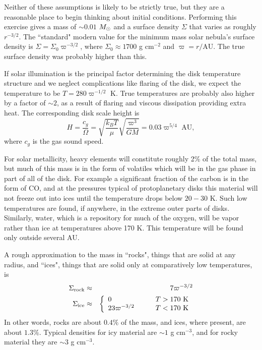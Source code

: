 Neither of these assumptions is likely to be strictly true, but they are a reasonable place to begin thinking about initial conditions. Performing this exercise gives a mass of $\sim 0.01$ $M_{\odot}$ and a surface density $\Sigma$ that varies as roughly $r^{-3/2}$. The ``standard" modern value for the minimum mass solar nebula's surface density is $\Sigma=\Sigma_0 \varpi^{-3/2}$, where $\Sigma_0 \approx 1700$ g cm$^{-2}$ and $\varpi=r/\mbox{AU}$. The true surface density was probably higher than this.

If solar illumination is the principal factor determining the disk temperature structure and we neglect complications like flaring of the disk, we expect the temperature to be $T=280 \varpi^{-1/2}$ K. True temperatures are probably also higher by a factor of $\sim 2$, as a result of flaring and viscous dissipation providing extra heat. The corresponding disk scale height is
\begin{equation}
H = \frac{c_g}{\Omega} = \sqrt{\frac{k_B T}{\mu}} \sqrt{\frac{\varpi^3}{GM}} = 0.03 \varpi^{5/4}\mbox{ AU},
\end{equation}
where $c_g$ is the gas sound speed.

For solar metallicity, heavy elements will constitute roughly 2\% of the total mass, but much of this mass is in the form of volatiles which will be in the gas phase in part of all of the disk. For example a significant fraction of the carbon is in the form of CO, and at the pressures typical of protoplanetary disks this material will not freeze out into ices until the temperature drops below $20-30$ K. Such low temperatures are found, if anywhere, in the extreme outer parts of disks. Similarly, water, which is a repository for much of the oxygen, will be vapor rather than ice at temperatures above 170 K. This temperature will be found only outside several AU.

A rough approximation to the mass in ``rocks", things that are solid at any radius, and ``ices", things that are solid only at comparatively low temperatures, is
\begin{eqnarray}
\Sigma_{\rm rock} & \approx & 7 \varpi^{-3/2} \\
\Sigma_{\rm ice} & \approx &
\left\{
\begin{array}{ll}
0 & T > 170\mbox{ K}\\
23\varpi^{-3/2} \qquad & T < 170\mbox{ K}
\end{array}
\right.
\end{eqnarray}
In other words, rocks are about $0.4\%$ of the mass, and ices, where present, are about $1.3\%$. Typical densities for icy material are $\sim 1$ g cm$^{-3}$, and for rocky material they are $\sim 3$ g cm$^{-3}$.

